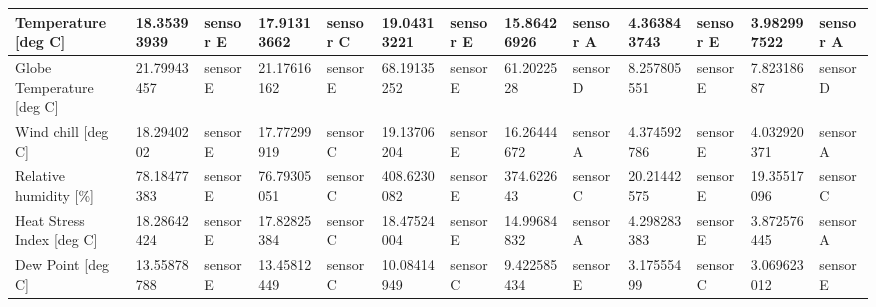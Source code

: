 \documentclass[a4paper,12pt]{article} %
\begin{document}
\begin{enumerate}
\begin{table} [H]
{\begin{tabular}{|l|l|l|l|l|l|l|l|l|l|l|l|l|}
Temperature {[}deg C{]}                                  & 18.35393939              & sensor E                    & 17.91313662              & sensor C                    & 19.04313221              & sensor E                    & 15.86426926              & sensor A                    & 4.363843743              & sensor E                    & 3.982997522              & sensor A                    \\ \hline
Globe Temperature {[}deg C{]}                            & 21.79943457              & sensor E                    & 21.17616162              & sensor E                    & 68.19135252              & sensor E                    & 61.2022528               & sensor D                    & 8.257805551              & sensor E                    & 7.82318687               & sensor D                    \\ \hline
Wind chill {[}deg C{]}                                   & 18.2940202               & sensor E                    & 17.77299919              & sensor C                    & 19.13706204              & sensor E                    & 16.26444672              & sensor A                    & 4.374592786              & sensor E                    & 4.032920371              & sensor A                    \\ \hline
Relative humidity {[}\%{]}                               & 78.18477383              & sensor E                    & 76.79305051              & sensor C                    & 408.6230082              & sensor E                    & 374.622643               & sensor C                    & 20.21442575              & sensor E                    & 19.35517096              & sensor C                    \\ \hline
Heat Stress Index {[}deg C{]}                            & 18.28642424              & sensor E                    & 17.82825384              & sensor C                    & 18.47524004              & sensor E                    & 14.99684832              & sensor A                    & 4.298283383              & sensor E                    & 3.872576445              & sensor A                    \\ \hline
Dew Point {[}deg C{]}                                    & 13.55878788              & sensor E                    & 13.45812449              & sensor C                    & 10.08414949              & sensor C                    & 9.422585434              & sensor E                    & 3.17555499               & sensor C                    & 3.069623012              & sensor E                    \\ \hline

\end{tabular}}
\end{table}
\end{enumerate}
\end{document}
